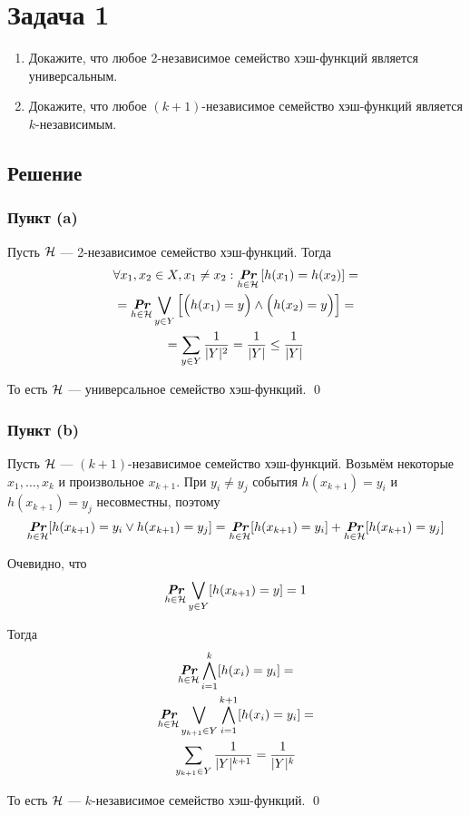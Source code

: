 \section{Задача 1}
\begin{enumerate}[label=(\alph*)]
\item Докажите, что любое 2-независимое семейство хэш-функций является универсальным.
\item Докажите, что любое $(k+1)$-независимое семейство хэш-функций является $k$-независимым.
\end{enumerate}

\subsection{Решение}
\subsubsection{Пункт (a)}
Пусть $\mathcal{H}$ --- 2-независимое семейство хэш-функций. Тогда
\begin{gather*}
    \forall x_1, x_2 \in X, x_1 \neq x_2 : \underset{h \in \mathcal{H}}{\textit{\textbf{Pr}}} \left[ h(x_1) = h(x_2) \right] = \\
    = \underset{h \in \mathcal{H}}{\textit{\textbf{Pr}}} \bigvee_{y \in Y} \left[ \Bigl( h(x_1) = y \Bigr) \land \Bigl( h(x_2) = y \Bigr) \right] = \\
    = \sum_{y \in Y} \frac{1}{|Y|^2} = \frac{1}{|Y|} \leq \frac{1}{|Y|}
\end{gather*}

То есть $\mathcal{H}$ --- универсальное семейство хэш-функций.
\qed

\subsubsection{Пункт (b)}
Пусть $\mathcal{H}$ --- $(k + 1)$-независимое семейство хэш-функций.
Возьмём некоторые $x_1,\ldots,x_k$ и произвольное $x_{k + 1}$.
При $y_i \neq y_j$ события $h(x_{k + 1}) = y_i$ и $h(x_{k + 1}) = y_j$ несовместны,
поэтому
\[ \underset{h \in \mathcal{H}}{\textit{\textbf{Pr}}} [h(x_{k + 1}) = y_i \lor h(x_{k + 1}) = y_j] = \underset{h \in \mathcal{H}}{\textit{\textbf{Pr}}} [h(x_{k + 1}) = y_i] + \underset{h \in \mathcal{H}}{\textit{\textbf{Pr}}} [h(x_{k + 1}) = y_j] \]

Очевидно, что
\[ \underset{h \in \mathcal{H}}{\textit{\textbf{Pr}}} \bigvee_{y \in Y} [h(x_{k + 1}) = y] = 1 \]

Тогда
\begin{gather*}
\underset{h \in \mathcal{H}}{\textit{\textbf{Pr}}} \bigwedge_{i=1}^k [ h(x_i) = y_i ] = \\
\underset{h \in \mathcal{H}}{\textit{\textbf{Pr}}} \bigvee_{y_{k + 1} \in Y} \bigwedge_{i=1}^{k+1} [ h(x_i) = y_i ] = \\
\sum_{y_{k + 1} \in Y} \frac{1}{|Y|^{k + 1}} = \frac{1}{|Y|^k} \\
\end{gather*}

То есть $\mathcal{H}$ --- $k$-независимое семейство хэш-функций.
\qed
